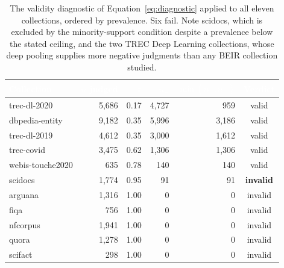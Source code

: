 \documentclass[sn-mathphys-num,pdflatex]{sn-jnl}
\newcommand{\thead}[1]{\textcolor{white}{\textbf{#1}}}
\begin{document}
\begin{table}[t]
\centering
\caption{The validity diagnostic of Equation~\eqref{eq:diagnostic} applied to all
eleven collections, ordered by prevalence. Six fail. Note scidocs, which is
excluded by the minority-support condition despite a prevalence below the stated
ceiling, and the two TREC Deep Learning collections, whose deep pooling supplies
more negative judgments than any BEIR collection
studied.}\label{tab:diagnostic}
\small
\begin{tabular}{lrrrrc}
\toprule
\rowcolor{headblue}
\thead{Collection} & \thead{$n$ judged} & \thead{$\pi$} & \thead{$n_{-}$} & \thead{$\min(n_+,n_-)$} & \thead{Verdict} \\
\midrule
\rowcolor{cleangreen}
trec-dl-2020     & 5{,}686 & 0.17 & 4{,}727 & 959     & valid \\
\rowcolor{cleangreen}
dbpedia-entity   & 9{,}182 & 0.35 & 5{,}996 & 3{,}186 & valid \\
\rowcolor{cleangreen}
trec-dl-2019     & 4{,}612 & 0.35 & 3{,}000 & 1{,}612 & valid \\
\rowcolor{cleangreen}
trec-covid       & 3{,}475 & 0.62 & 1{,}306 & 1{,}306 & valid \\
\rowcolor{cleangreen}
webis-touche2020 & 635     & 0.78 & 140     & 140     & valid \\
\rowcolor{singleclasspink}
scidocs          & 1{,}774 & 0.95 & 91      & 91      & \textbf{invalid} \\
\rowcolor{singleclasspink}
arguana          & 1{,}316 & 1.00 & 0       & 0       & invalid \\
\rowcolor{singleclasspink}
fiqa             & 756     & 1.00 & 0       & 0       & invalid \\
\rowcolor{singleclasspink}
nfcorpus         & 1{,}941 & 1.00 & 0       & 0       & invalid \\
\rowcolor{singleclasspink}
quora            & 1{,}278 & 1.00 & 0       & 0       & invalid \\
\rowcolor{singleclasspink}
scifact          & 298     & 1.00 & 0       & 0       & invalid \\
\bottomrule
\end{tabular}
\end{table}
\end{document}
